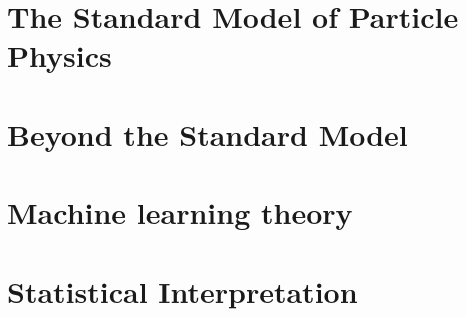 \documentclass[twoside,11pt]{report}
\begin{document}
\section{The Standard Model of Particle Physics}

\section{Beyond the Standard Model}

\section{Machine learning theory} 

\section{Statistical Interpretation}

% 
% 
% 
% 
% 
%  
% 
% 




% 

% 
% 
% 
% 
% 





\printbibliography
% 
% 
\end{document}
